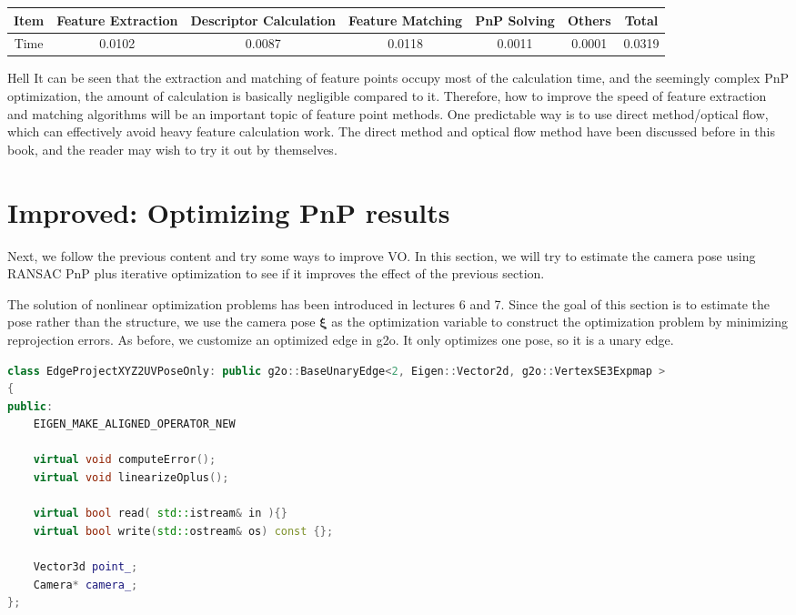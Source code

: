 \begin{enumerate}
\begin{table}[!ht]
\label{table: runtime-exp1}
\begin{tabu}{c | c | c | c | c | c | c}
\toprule
Item & Feature Extraction & Descriptor Calculation & Feature Matching & PnP Solving & Others & Total \\\midrule
Time & 0.0102 & 0.0087 & 0.0118 & 0.0011 & 0.0001 & 0.0319 \\
\bottomrule
\end{tabu}
\end{table}
Hell
It can be seen that the extraction and matching of feature points occupy most of the calculation time, and the seemingly complex PnP optimization, the amount of calculation is basically negligible compared to it. Therefore, how to improve the speed of feature extraction and matching algorithms will be an important topic of feature point methods. One predictable way is to use direct method/optical flow, which can effectively avoid heavy feature calculation work. The direct method and optical flow method have been discussed before in this book, and the reader may wish to try it out by themselves.
\end{enumerate}

\section{Improved: Optimizing PnP results}
Next, we follow the previous content and try some ways to improve VO. In this section, we will try to estimate the camera pose using RANSAC PnP plus iterative optimization to see if it improves the effect of the previous section.

\clearpage
The solution of nonlinear optimization problems has been introduced in lectures 6 and 7. Since the goal of this section is to estimate the pose rather than the structure, we use the camera pose $ \bm{\xi} $ as the optimization variable to construct the optimization problem by minimizing reprojection errors. As before, we customize an optimized edge in g2o. It only optimizes one pose, so it is a unary edge.
\begin{lstlisting}[language=c++,caption=slambook/project/0.3/include/myslam/g2o\_types.h]
class EdgeProjectXYZ2UVPoseOnly: public g2o::BaseUnaryEdge<2, Eigen::Vector2d, g2o::VertexSE3Expmap >
{
public:
	EIGEN_MAKE_ALIGNED_OPERATOR_NEW
	
	virtual void computeError();
	virtual void linearizeOplus();
	
	virtual bool read( std::istream& in ){}
	virtual bool write(std::ostream& os) const {};
	
	Vector3d point_;
	Camera* camera_;
};
\end{lstlisting}

